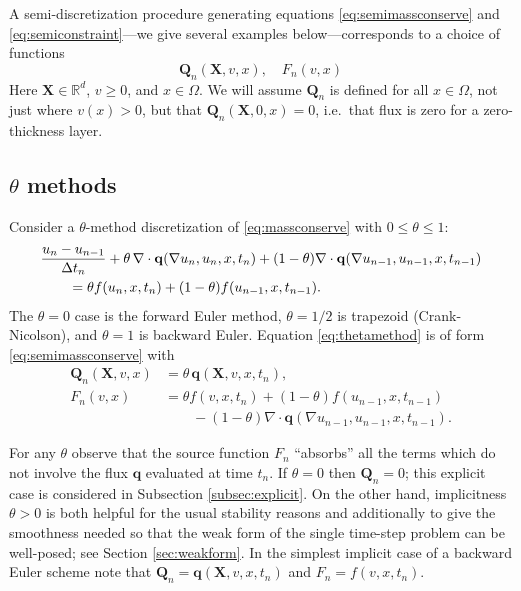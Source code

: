 \documentclass[final,onefignum]{siamart190516}
\newcommand\bq{\mathbf{q}}
\newcommand\bQ{\mathbf{Q}}
\newcommand\bX{\mathbf{X}}
\newcommand{\Div}{\nabla\cdot}
\newcommand{\grad}{\nabla}
\newcommand\RR{\mathbb{R}}
\begin{document}
A semi-discretization procedure generating equations \eqref{eq:semimassconserve} and \eqref{eq:semiconstraint}---we give several examples below---corresponds to a choice of functions
\begin{equation}
\bQ_n(\bX,v,x), \quad F_n(v,x) \label{eq:functionalforms}
\end{equation}
Here $\bX\in\RR^d$, $v\ge 0$, and $x\in \Omega$.  We will assume $\bQ_n$ is defined for all $x\in\Omega$, not just where $v(x)>0$, but that $\bQ_n(\bX,0,x)=0$, i.e.~that flux is zero for a zero-thickness layer.

\subsection{$\theta$ methods}  \label{subsec:thetamethods}  Consider a $\theta$-method discretization \cite{MortonMayers2005} of \eqref{eq:massconserve} with $0\le \theta \le 1$:
\begin{align}
  &\frac{u_n - u_{n-1}}{\Delta t_n} + \theta\, \Div \bq(\grad u_n,u_n,x,t_n) + (1-\theta) \Div \bq(\grad u_{n-1},u_{n-1},x,t_{n-1}) \label{eq:thetamethod} \\
  &\qquad =  \theta f(u_n,x,t_n) + (1-\theta) f(u_{n-1},x,t_{n-1}). \notag
\end{align}
The $\theta=0$ case is the forward Euler method, $\theta=1/2$ is trapezoid (Crank-Nicolson), and $\theta=1$ is backward Euler.  Equation \eqref{eq:thetamethod} is of form \eqref{eq:semimassconserve} with
\begin{align*}
\bQ_n(\bX,v,x) &= \theta\, \bq(\bX,v,x,t_n), \\
F_n(v,x)       &= \theta f(v,x,t_n) + (1-\theta) f(u_{n-1},x,t_{n-1}) \\
               &\qquad - (1-\theta) \Div \bq(\grad u_{n-1},u_{n-1},x,t_{n-1}).
\end{align*}

For any $\theta$ observe that the source function $F_n$ ``absorbs'' all the terms which do not involve the flux $\bq$ evaluated at time $t_n$.  If $\theta=0$ then $\bQ_n=0$; this explicit case is considered in Subsection \ref{subsec:explicit}.  On the other hand, implicitness $\theta>0$ is both helpful for the usual stability reasons \cite{MortonMayers2005} and additionally to give the smoothness needed so that the weak form of the single time-step problem can be well-posed; see Section \ref{sec:weakform}.  In the simplest implicit case of a backward Euler scheme note that $\bQ_n = \bq(\bX,v,x,t_n)$ and $F_n = f(v,x,t_n)$.
\end{document}
